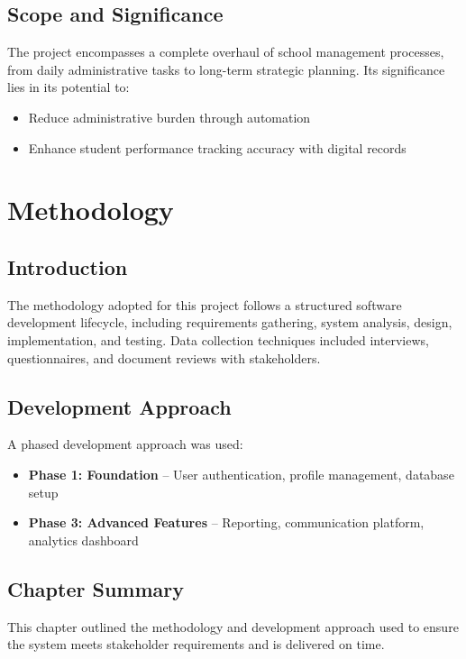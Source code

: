 \documentclass[12pt,a4paper]{report}
\begin{document}
\section{Scope and Significance}
The project encompasses a complete overhaul of school management processes, from daily administrative tasks to long-term strategic planning. Its significance lies in its potential to:
\begin{itemize}
    \item Reduce administrative burden through automation
    \item Enhance student performance tracking accuracy with digital records
\end{itemize}

\chapter{Methodology}
\section{Introduction}
The methodology adopted for this project follows a structured software development lifecycle, including requirements gathering, system analysis, design, implementation, and testing. Data collection techniques included interviews, questionnaires, and document reviews with stakeholders.

\section{Development Approach}
A phased development approach was used:
\begin{itemize}
    \item \textbf{Phase 1: Foundation} -- User authentication, profile management, database setup
    \item \textbf{Phase 3: Advanced Features} -- Reporting, communication platform, analytics dashboard
\end{itemize}

\section{Chapter Summary}
This chapter outlined the methodology and development approach used to ensure the system meets stakeholder requirements and is delivered on time.
\end{document}
